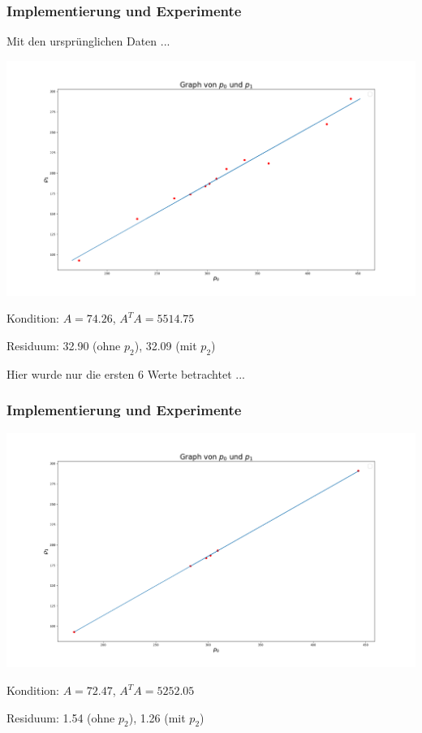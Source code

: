 \documentclass{beamer}
\begin{document}
\begin{frame}
\frametitle{Implementierung und Experimente}

Mit den ursprünglichen Daten ...

\includegraphics[width=\textwidth]{plot.png}

Kondition: $A = 74.26$, $A^T A = 5514.75$

Residuum: 32.90 (ohne $p_2$), 32.09 (mit $p_2$)
\end{frame}

\begin{frame}
Hier wurde nur die ersten 6 Werte betrachtet ...

\frametitle{Implementierung und Experimente}
\includegraphics[width=\textwidth]{plot1.png}

Kondition: $A = 72.47$, $A^T A = 5252.05$

Residuum: 1.54 (ohne $p_2$), 1.26 (mit $p_2$)
\end{frame}
\end{document}
